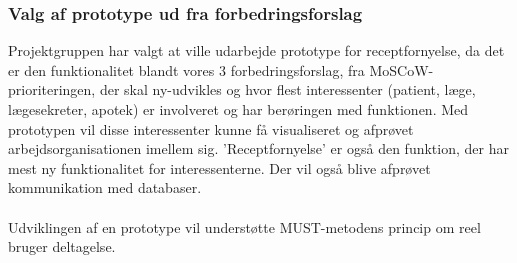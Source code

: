 \subsubsection{Valg af prototype ud fra forbedringsforslag}
Projektgruppen har valgt at ville udarbejde prototype for receptfornyelse, da det er den funktionalitet blandt vores 3 forbedringsforslag, fra MoSCoW-prioriteringen, der skal ny-udvikles og hvor flest interessenter (patient, læge, lægesekreter, apotek) er involveret og har berøringen med funktionen. Med prototypen vil disse interessenter kunne få visualiseret og afprøvet arbejdsorganisationen imellem sig. ’Receptfornyelse’ er også den funktion, der har mest ny funktionalitet for interessenterne. 
Der vil også blive afprøvet kommunikation med databaser. \\ 
\\
Udviklingen af en prototype vil understøtte MUST-metodens princip om reel bruger deltagelse.
